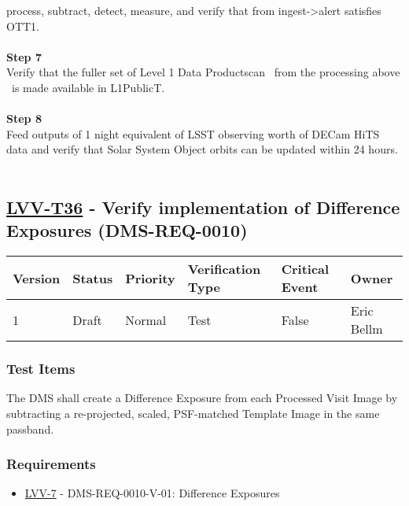 process, subtract, detect, measure, and verify that from
ingest-\textgreater{}alert satisfies OTT1.\\
~\\
\textbf{Step 7}\\
Verify that the fuller set of Level 1 Data Productscan ~from the
processing above ~is made available in L1PublicT.\\
~\\
\textbf{Step 8}\\
Feed outputs of 1 night equivalent of LSST observing worth of DECam HiTS
data and verify that Solar System Object orbits can be updated within 24
hours.\\
~\\

\hypertarget{lvv-t36---verify-implementation-of-difference-exposures-dms-req-0010}{%
\subsection{\texorpdfstring{\href{https://jira.lsstcorp.org/secure/Tests.jspa\#/testCase/LVV-T36}{LVV-T36}
- Verify implementation of Difference Exposures
(DMS-REQ-0010)}{LVV-T36 - Verify implementation of Difference Exposures (DMS-REQ-0010)}}\label{lvv-t36---verify-implementation-of-difference-exposures-dms-req-0010}}

\begin{longtable}[]{@{}llllll@{}}
\toprule
Version & Status & Priority & Verification Type & Critical Event &
Owner\tabularnewline
\midrule
\endhead
1 & Draft & Normal & Test & False & Eric Bellm\tabularnewline
\bottomrule
\end{longtable}

\hypertarget{test-items-125}{%
\subsubsection{Test Items}\label{test-items-125}}

The DMS shall create a Difference Exposure from each Processed Visit
Image by subtracting a re-projected, scaled, PSF-matched Template Image
in the same passband.

\hypertarget{requirements-126}{%
\subsubsection{Requirements}\label{requirements-126}}

\begin{itemize}
\tightlist
\item
  \href{https://jira.lsstcorp.org/browse/LVV-7}{LVV-7} -
  DMS-REQ-0010-V-01: Difference Exposures
\end{itemize}

